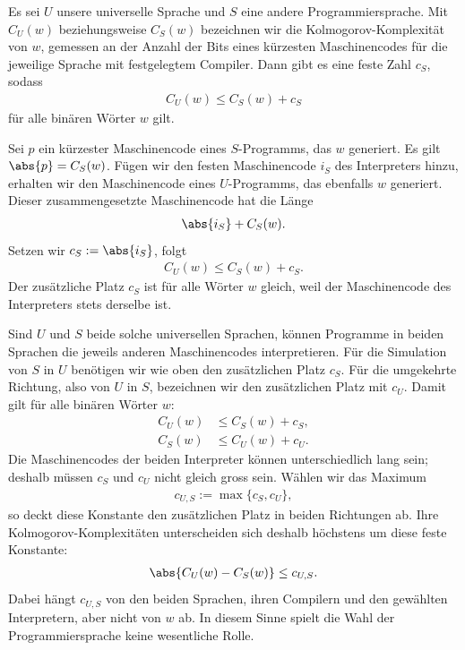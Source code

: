 \begin{mytheorem}[Invarianzsatz]\label{mytheorem:Sprachinvarianz}
	Es sei $U$ unsere universelle Sprache und $S$ eine andere Programmiersprache. Mit $C_U(w)$ beziehungsweise $C_S(w)$ bezeichnen wir die Kolmogorov-Komplexität von $w$, gemessen an der Anzahl der Bits eines kürzesten Maschinencodes für die jeweilige Sprache mit festgelegtem Compiler. Dann gibt es eine feste Zahl $c_S$, sodass
	\begin{align*}
		C_U(w)\leq C_S(w)+c_S
	\end{align*}
	für alle binären Wörter $w$ gilt.
	\begin{myproof}
		Sei $p$ ein kürzester Maschinencode eines $S$-Programms, das $w$ generiert. Es gilt $\abs{p}=C_S(w)$. Fügen wir den festen Maschinencode $i_S$ des Interpreters hinzu, erhalten wir den Maschinencode eines $U$-Programms, das ebenfalls $w$ generiert. Dieser zusammengesetzte Maschinencode hat die Länge
		\begin{align*}
			\abs{i_S}+C_S(w).
		\end{align*}
		Setzen wir $c_S:=\abs{i_S}$, folgt
		\begin{align*}
			C_U(w)\leq C_S(w)+c_S.
		\end{align*}
		Der zusätzliche Platz $c_S$ ist für alle Wörter $w$ gleich, weil der Maschinencode des Interpreters stets derselbe ist.
	\end{myproof}
\end{mytheorem}
Sind $U$ und $S$ beide solche universellen Sprachen, können Programme in beiden Sprachen die jeweils anderen Maschinencodes interpretieren. Für die Simulation von $S$ in $U$ benötigen wir wie oben den zusätzlichen Platz $c_S$. Für die umgekehrte Richtung, also von $U$ in $S$, bezeichnen wir den zusätzlichen Platz mit $c_U$. Damit gilt für alle binären Wörter $w$:
\begin{align*}
	C_U(w)&\leq C_S(w)+c_S,\\
	C_S(w)&\leq C_U(w)+c_U.
\end{align*}
Die Maschinencodes der beiden Interpreter können unterschiedlich lang sein; deshalb müssen $c_S$ und $c_U$ nicht gleich gross sein. Wählen wir das Maximum
\begin{align*}
	c_{U,S}:=\max\{c_S,c_U\},
\end{align*}
so deckt diese Konstante den zusätzlichen Platz in beiden Richtungen ab. Ihre Kolmogorov-Komplexitäten unterscheiden sich deshalb höchstens um diese feste Konstante:
\begin{align*}
	\abs{C_U(w)-C_S(w)}\leq c_{U,S}.
\end{align*}
Dabei hängt $c_{U,S}$ von den beiden Sprachen, ihren Compilern und den gewählten Interpretern, aber nicht von $w$ ab. In diesem Sinne spielt die Wahl der Programmiersprache keine wesentliche Rolle.

